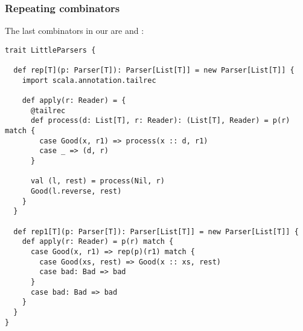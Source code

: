 \documentclass[t]{beamer}
\begin{document}

\begin{frame}[fragile]
\frametitle{Repeating combinators}
The last combinators in our  are  and :
\begin{lstlisting}
trait LittleParsers {

  def rep[T](p: Parser[T]): Parser[List[T]] = new Parser[List[T]] {
    import scala.annotation.tailrec

    def apply(r: Reader) = {
      @tailrec
      def process(d: List[T], r: Reader): (List[T], Reader) = p(r) match {
        case Good(x, r1) => process(x :: d, r1)
        case _ => (d, r)
      }

      val (l, rest) = process(Nil, r)
      Good(l.reverse, rest)
    }
  }

  def rep1[T](p: Parser[T]): Parser[List[T]] = new Parser[List[T]] {
    def apply(r: Reader) = p(r) match {
      case Good(x, r1) => rep(p)(r1) match {
        case Good(xs, rest) => Good(x :: xs, rest)
        case bad: Bad => bad
      }
      case bad: Bad => bad
    }
  }
}
\end{lstlisting}
\end{frame}
\end{document}
